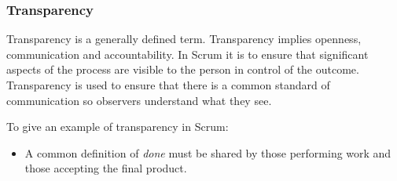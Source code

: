 \subsubsection{Transparency}


Transparency is a generally defined term. Transparency implies openness, communication and accountability. In Scrum it is to ensure that significant aspects of the process are visible to the person in control of the outcome\cite{scrumguide11}. Transparency is used to ensure that there is a common standard of communication so observers understand what they see\cite{scrumguide11}.

To give an example of transparency in Scrum:


\begin{itemize}
	\item A common definition of \textit{done} must be shared by those performing work and those accepting the final product\cite{scrumguide11}.
\end{itemize}